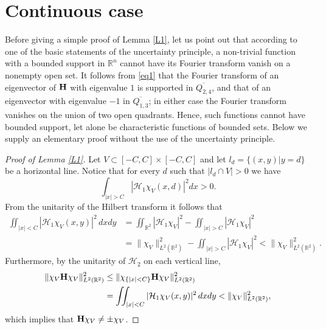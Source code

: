 \documentclass{article}
\def\H{{\bf H}}
\def\HH{{\mathcal H}}
\def\R{{\mathbb R}}
\begin{document}
	\section{Continuous case}

	Before giving a simple proof of Lemma \ref{L1}, let us point out that according to one of the basic statements of the uncertainty principle, a non-trivial function with a bounded support in $\R^n$
	cannot have its Fourier transform vanish on a nonempty open set. It follows from \eqref{eq1} that the Fourier transform of an eigenvector of $\H$ with eigenvalue $1$ is supported in $\overline{Q_{2,4}}$, and that of an eigenvector with eigenvalue $-1$ in $\overline{Q_{1,3}}$; in either case the Fourier transform vanishes on the union of two open quadrants. Hence, such functions cannot have bounded support, let alone be characteristic functions of bounded sets. Below we supply an elementary proof without the use of the uncertainty principle.

	\begin{proof}[Proof of Lemma \ref{L1}]
		Let $V\subset [-C,C]\times [-C,C]$ and let $l_d=\{(x,y)|y=d\}$ be a horizontal line.
		Notice that for every $d$ such that $|l_d\cap V|>0$ we have
		$$\int_{|x|>C}|\mathcal{H}_1\chi_V(x,d)|^2dx>0.$$
		From the unitarity of the Hilbert transform it follows that
		\begin{align*}
		\iint_{|x|<C}|\mathcal{H}_1\chi_V(x,y)|^2\,dxdy&=\iint_{\R^2}|\mathcal{H}_1\chi_V|^2-
		\iint_{|x|>C}|\mathcal{H}_1\chi_V|^2\\
		&=\|\chi_V\|^2_{L^2(\R^2)}-\iint_{|x|>C}|\mathcal{H}_1\chi_V|^2<\|\chi_V\|^2_{L^2(\R^2)}.
		\end{align*}
		Furthermore, by the unitarity of $\HH_2$ on each vertical line,
		\begin{align*}
		\|\chi_V \H\chi_V\|^2_{L^2(\R^2)}&\leq \|\chi_{\{|x|<C\}} \H\chi_V\|^2_{L^2(\R^2)}\\
		&=\iint_{|x|<C}|\mathcal{H}_1\chi_V(x,y)|^2\,dxdy<\|\chi_V\|^2_{L^2(\R^2)},
		\end{align*}
		which implies that $\H\chi_V\neq \pm \chi_V$.
	\end{proof}
\end{document}
